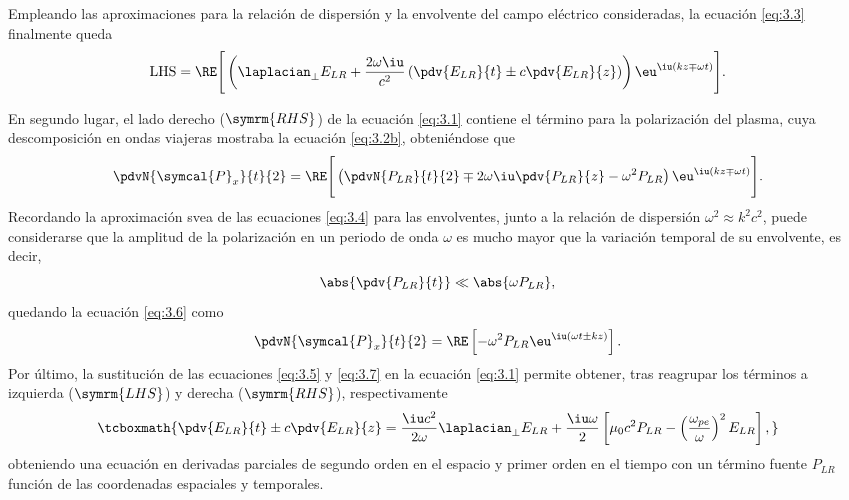 Empleando las aproximaciones para la relación de dispersión y la envolvente del campo eléctrico consideradas, la ecuación \eqref{eq:3.3} finalmente queda
\begin{equation}\label{eq:3.5}
  \mathrm{LHS} =
  \RE \Bigg[\left(\laplacian_{\perp}E_{LR} + \frac{2 \omega \iu }{c^{2}} \left(\pdv{E_{LR}}{t} \pm c \pdv{E_{LR}}{z}\right)\right)\eu^{\iu (kz \mp \omega t)}\Bigg].
\end{equation}

En segundo lugar, el lado derecho ($\symrm{RHS}$) de la ecuación \eqref{eq:3.1} contiene el término para la polarización del plasma, cuya descomposición en ondas viajeras mostraba la ecuación \eqref{eq:3.2b}, obteniéndose que
\begin{equation}\label{eq:3.6}
  \pdvN{\symcal{P}_{x}}{t}{2} = 
  \RE \Bigg[\left(\pdvN{P_{LR}}{t}{2} \mp 2 \omega \iu \pdv{P_{LR}}{z} - \omega^{2}P_{LR}\right)\eu^{\iu (kz \mp \omega t)}\Bigg].
\end{equation}
Recordando la aproximación \acrshort{svea} de las ecuaciones \eqref{eq:3.4} para las envolventes, junto a la relación de dispersión $\omega^{2} \approx k^{2}c^{2}$, puede considerarse que la amplitud de la polarización en un periodo de onda $\omega$ es mucho mayor que la variación temporal de su envolvente, es decir,
\begin{equation}
  \abs{\pdv{P_{LR}}{t}} \ll \abs{\omega P_{LR}},
\end{equation}
quedando la ecuación \eqref{eq:3.6} como
\begin{equation}\label{eq:3.7}
  \pdvN{\symcal{P}_{x}}{t}{2} = \RE \left[- \omega^{2}P_{LR}\eu^{\iu (\omega t \pm kz)}\right].
\end{equation}
Por último, la sustitución de las ecuaciones \eqref{eq:3.5} y \eqref{eq:3.7} en la ecuación \eqref{eq:3.1} permite obtener, tras reagrupar los términos a izquierda ($\symrm{LHS}$) y derecha ($\symrm{RHS}$), respectivamente
\begin{equation}\label{eq:3.8}
  \tcboxmath{\pdv{E_{LR}}{t} \pm c \pdv{E_{LR}}{z} = \frac{\iu c^{2}}{2 \omega}\laplacian_{\perp}E_{LR} + \frac{\iu \omega}{2} \left[\mu_{0}c^{2}P_{LR} - \left(\frac{\omega_{pe}}{\omega}\right)^{2}E_{LR}\right],}
\end{equation}
obteniendo una ecuación en derivadas parciales de segundo orden en el espacio y primer orden en el tiempo con un término fuente $P_{LR}$ función de las coordenadas espaciales y temporales. 

